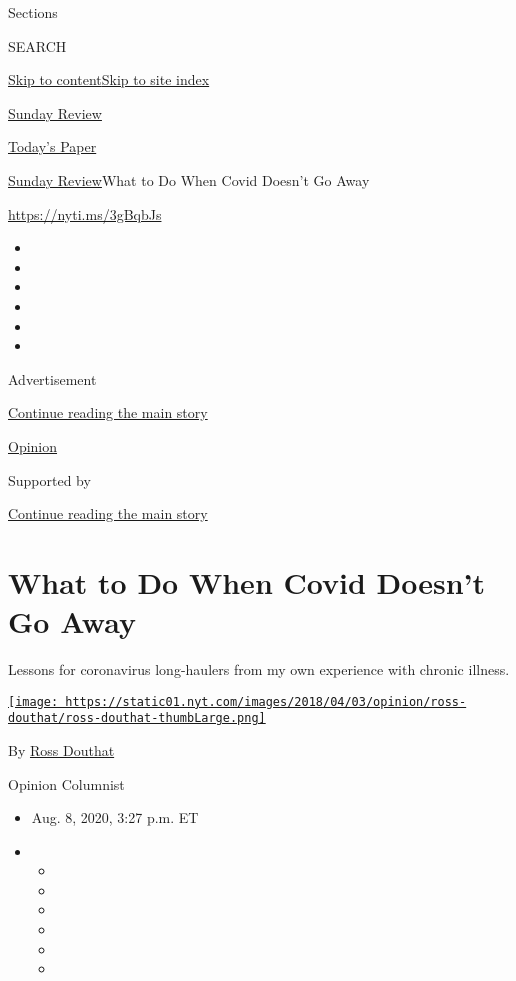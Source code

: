 Sections

SEARCH

\protect\hyperlink{site-content}{Skip to
content}\protect\hyperlink{site-index}{Skip to site index}

\href{https://www.nytimes.com/section/opinion/sunday}{Sunday Review}

\href{https://myaccount.nytimes.com/auth/login?response_type=cookie\&client_id=vi}{}

\href{https://www.nytimes.com/section/todayspaper}{Today's Paper}

\href{/section/opinion/sunday}{Sunday Review}\textbar{}What to Do When
Covid Doesn't Go Away

\href{https://nyti.ms/3gBqbJs}{https://nyti.ms/3gBqbJs}

\begin{itemize}
\item
\item
\item
\item
\item
\item
\end{itemize}

Advertisement

\protect\hyperlink{after-top}{Continue reading the main story}

\href{/section/opinion}{Opinion}

Supported by

\protect\hyperlink{after-sponsor}{Continue reading the main story}

\hypertarget{what-to-do-when-covid-doesnt-go-away}{%
\section{What to Do When Covid Doesn't Go
Away}\label{what-to-do-when-covid-doesnt-go-away}}

Lessons for coronavirus long-haulers from my own experience with chronic
illness.

\href{https://www.nytimes.com/by/ross-douthat}{\texttt{[image: https://static01.nyt.com/images/2018/04/03/opinion/ross-douthat/ross-douthat-thumbLarge.png]}}

By \href{https://www.nytimes.com/by/ross-douthat}{Ross Douthat}

Opinion Columnist

\begin{itemize}
\item
  Aug. 8, 2020, 3:27 p.m. ET
\item
  \begin{itemize}
  \item
  \item
  \item
  \item
  \item
  \item
  \end{itemize}
\end{itemize}

